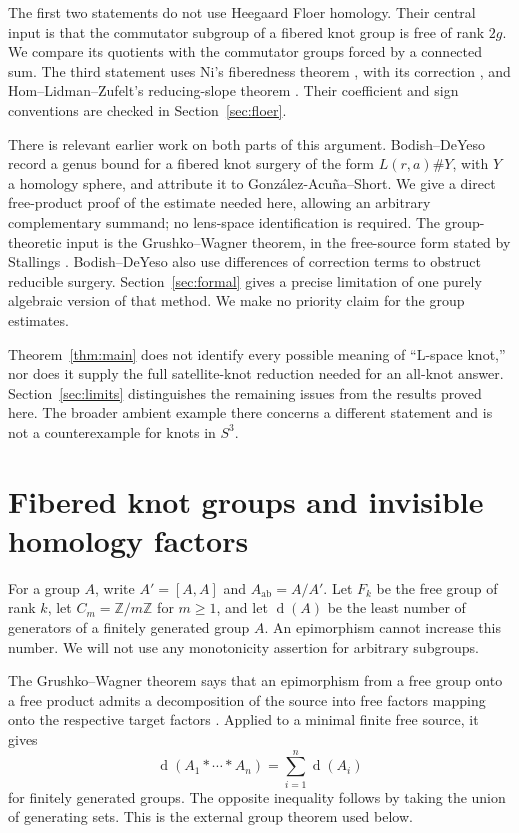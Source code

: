 \documentclass[11pt]{article}
\theoremstyle{remark}
\newcommand{\Z}{\mathbb Z}
\newcommand{\ab}{\mathrm{ab}}
\newcommand{\gen}{\operatorname{d}}
\begin{document}
The first two statements do not use Heegaard Floer homology. Their central input is that the commutator subgroup of a fibered knot group is free of rank $2g$. We compare its quotients with the commutator groups forced by a connected sum. The third statement uses Ni's fiberedness theorem \cite[Corollary~1.3]{Ni}, with its correction \cite{NiErr}, and Hom--Lidman--Zufelt's reducing-slope theorem \cite[Theorem~1.3]{HLZ}. Their coefficient and sign conventions are checked in Section~\ref{sec:floer}.

There is relevant earlier work on both parts of this argument. Bodish--DeYeso \cite[Theorem~1.2]{BD} record a genus bound for a fibered knot surgery of the form $L(r,a)\#Y$, with $Y$ a homology sphere, and attribute it to Gonz\'alez-Acu\~na--Short. We give a direct free-product proof of the estimate needed here, allowing an arbitrary complementary summand; no lens-space identification is required. The group-theoretic input is the Grushko--Wagner theorem, in the free-source form stated by Stallings \cite[Section~1.B.5, p.~6]{Stallings}. Bodish--DeYeso also use differences of correction terms to obstruct reducible surgery. Section~\ref{sec:formal} gives a precise limitation of one purely algebraic version of that method. We make no priority claim for the group estimates.

Theorem~\ref{thm:main} does not identify every possible meaning of ``L-space knot,'' nor does it supply the full satellite-knot reduction needed for an all-knot answer. Section~\ref{sec:limits} distinguishes the remaining issues from the results proved here. The broader ambient example there concerns a different statement and is not a counterexample for knots in $S^3$.

\section{Fibered knot groups and invisible homology factors}\label{sec:groups}

For a group $A$, write $A'=[A,A]$ and $A_{\ab}=A/A'$. Let $F_k$ be the free group of rank $k$, let $C_m=\Z/m\Z$ for $m\geq1$, and let $\gen(A)$ be the least number of generators of a finitely generated group $A$. An epimorphism cannot increase this number. We will not use any monotonicity assertion for arbitrary subgroups.

The Grushko--Wagner theorem says that an epimorphism from a free group onto a free product admits a decomposition of the source into free factors mapping onto the respective target factors \cite[Section~1.B.5]{Stallings}. Applied to a minimal finite free source, it gives
\begin{equation}\label{eq:grushko}
 \gen(A_1*\cdots*A_n)=\sum_{i=1}^n\gen(A_i)
\end{equation}
for finitely generated groups. The opposite inequality follows by taking the union of generating sets. This is the external group theorem used below.
\end{document}
